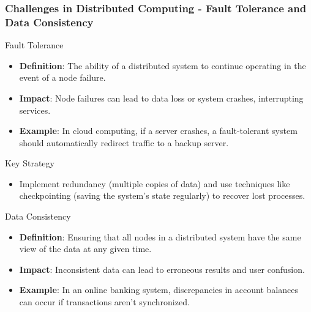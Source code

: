 \documentclass[aspectratio=169]{beamer}
\begin{document}
\begin{frame}[fragile]
  \frametitle{Challenges in Distributed Computing - Fault Tolerance and Data Consistency}
  
  \begin{block}{Fault Tolerance}
    \begin{itemize}
      \item \textbf{Definition}: The ability of a distributed system to continue operating in the event of a node failure.
      \item \textbf{Impact}: Node failures can lead to data loss or system crashes, interrupting services.
      \item \textbf{Example}: In cloud computing, if a server crashes, a fault-tolerant system should automatically redirect traffic to a backup server.
    \end{itemize}
  \end{block}

  \begin{block}{Key Strategy}
    \begin{itemize}
      \item Implement redundancy (multiple copies of data) and use techniques like checkpointing (saving the system's state regularly) to recover lost processes.
    \end{itemize}
  \end{block}

  \begin{block}{Data Consistency}
    \begin{itemize}
      \item \textbf{Definition}: Ensuring that all nodes in a distributed system have the same view of the data at any given time.
      \item \textbf{Impact}: Inconsistent data can lead to erroneous results and user confusion.
      \item \textbf{Example}: In an online banking system, discrepancies in account balances can occur if transactions aren't synchronized.
    \end{itemize}
  \end{block}
  
\end{frame}
\end{document}
